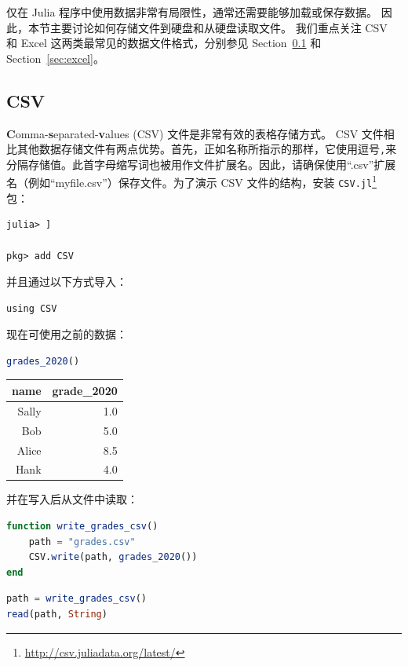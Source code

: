 \documentclass[
  notoc %
]{tufte-book}
\DeclareRobustCommand{\href}[2]{#2\footnote{\url{#1}}}
\newcommand{\passthrough}[1]{#1}
\begin{document}
仅在 Julia 程序中使用数据非常有局限性，通常还需要能够加载或保存数据。
因此，本节主要讨论如何存储文件到硬盘和从硬盘读取文件。 我们重点关注 CSV
和 Excel 这两类最常见的数据文件格式，分别参见 Section~\ref{sec:csv} 和
Section~\ref{sec:excel}。

\hypertarget{sec:csv}{%
\subsection{CSV}\label{sec:csv}}

\textbf{C}omma-\textbf{s}eparated-\textbf{v}alues (CSV)
文件是非常有效的表格存储方式。 CSV
文件相比其他数据存储文件有两点优势。首先，正如名称所指示的那样，它使用逗号\passthrough{\lstinline!,!}来分隔存储值。此首字母缩写词也被用作文件扩展名。因此，请确保使用``.csv''扩展名（例如``myfile.csv''）保存文件。为了演示
CSV 文件的结构，安装
\href{http://csv.juliadata.org/latest/}{\passthrough{\lstinline!CSV.jl!}}
包：

\begin{lstlisting}
julia> ]

pkg> add CSV
\end{lstlisting}

并且通过以下方式导入：

\begin{lstlisting}
using CSV
\end{lstlisting}

现在可使用之前的数据：

\begin{lstlisting}[language=Julia]
grades_2020()
\end{lstlisting}

\begin{longtable}[]{@{}rr@{}}
\toprule
name & grade\_2020 \\
\midrule
\endhead
Sally & 1.0 \\
Bob & 5.0 \\
Alice & 8.5 \\
Hank & 4.0 \\
\bottomrule
\end{longtable}

并在写入后从文件中读取：

\begin{lstlisting}[language=Julia]
function write_grades_csv()
    path = "grades.csv"
    CSV.write(path, grades_2020())
end
\end{lstlisting}

\begin{lstlisting}[language=Julia]
path = write_grades_csv()
read(path, String)
\end{lstlisting}
\end{document}
